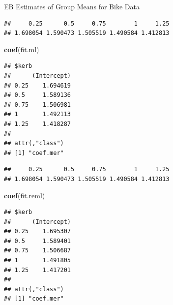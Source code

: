 \documentclass[ignorenonframetext,]{beamer}
\newenvironment{Shaded}{\begin{snugshade}}{\end{snugshade}}
\newcommand{\KeywordTok}[1]{\textcolor[rgb]{0.13,0.29,0.53}{\textbf{#1}}}
\newcommand{\DataTypeTok}[1]{\textcolor[rgb]{0.13,0.29,0.53}{#1}}
\newcommand{\StringTok}[1]{\textcolor[rgb]{0.31,0.60,0.02}{#1}}
\newcommand{\OperatorTok}[1]{\textcolor[rgb]{0.81,0.36,0.00}{\textbf{#1}}}
\newcommand{\NormalTok}[1]{#1}
\begin{document}
\begin{frame}[fragile]{EB Estimates of Group Means for Bike Data}

\begin{Shaded}
\end{Shaded}

\begin{verbatim}
##     0.25      0.5     0.75        1     1.25 
## 1.698054 1.590473 1.505519 1.490584 1.412813
\end{verbatim}

\begin{Shaded}
\begin{Highlighting}[]
\KeywordTok{coef}\NormalTok{(fit.ml)}
\end{Highlighting}
\end{Shaded}

\begin{verbatim}
## $kerb
##      (Intercept)
## 0.25    1.694619
## 0.5     1.589136
## 0.75    1.506981
## 1       1.492113
## 1.25    1.418287
## 
## attr(,"class")
## [1] "coef.mer"
\end{verbatim}

\end{frame}

\begin{frame}[fragile]{}

\begin{Shaded}
\end{Shaded}

\begin{verbatim}
##     0.25      0.5     0.75        1     1.25 
## 1.698054 1.590473 1.505519 1.490584 1.412813
\end{verbatim}

\begin{Shaded}
\begin{Highlighting}[]
\KeywordTok{coef}\NormalTok{(fit.reml)}
\end{Highlighting}
\end{Shaded}

\begin{verbatim}
## $kerb
##      (Intercept)
## 0.25    1.695307
## 0.5     1.589401
## 0.75    1.506687
## 1       1.491805
## 1.25    1.417201
## 
## attr(,"class")
## [1] "coef.mer"
\end{verbatim}

\end{frame}
\end{document}
